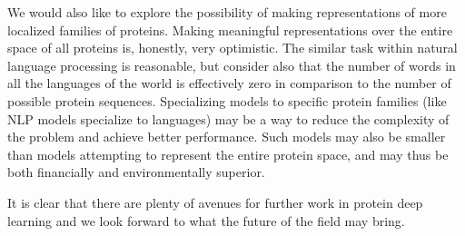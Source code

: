 \documentclass[a4paper,12pt]{article}
\begin{document}
We would also like to explore the possibility of making representations of more localized families of proteins. Making meaningful representations over the entire space of all proteins is, honestly, very optimistic. The similar task within natural language processing is reasonable, but consider also that the number of words in all the languages of the world is effectively zero in comparison to the number of possible protein sequences. Specializing models to specific protein families (like NLP models specialize to languages) may be a way to reduce the complexity of the problem and achieve better performance. Such models may also be smaller than models attempting to represent the entire protein space, and may thus be both financially and environmentally superior.

It is clear that there are plenty of avenues for further work in protein deep learning and we look forward to what the future of the field may bring.


\clearpage
{}
\printbibliography[title={References}]
\end{document}
